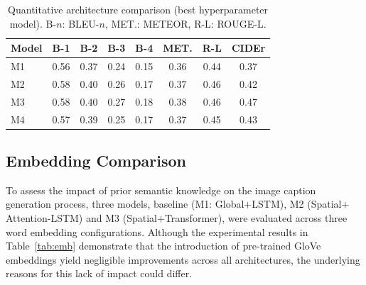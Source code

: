 \documentclass[10pt,twocolumn,letterpaper]{article}
\begin{document}
\begin{table}[t]
\begin{center}
\setlength{\tabcolsep}{4pt}
\begin{tabular}{lccccccc}
\toprule
Model & B-1 & B-2 & B-3 & B-4 & MET. & R-L & CIDEr \\
\midrule
M1 & 0.56 & 0.37 & 0.24 & 0.15 & 0.36 & 0.44 & 0.37 \\
M2 & 0.58 & 0.40 & 0.26 & 0.17 & 0.37 & 0.46 & 0.42 \\
M3 & 0.58 & 0.40 & 0.27 & 0.18 & 0.38 & 0.46 & 0.47 \\
M4 & 0.57 & 0.39 & 0.25 & 0.17 & 0.37 & 0.45 & 0.43 \\
\bottomrule
\end{tabular}
\caption{\footnotesize Quantitative architecture comparison (best
hyperparameter model). B-$n$: BLEU-$n$, MET.: METEOR, R-L: ROUGE-L.}
\label{tab:arch}
\end{center}
\end{table}

\subsection{Embedding Comparison}
To assess the impact of prior semantic knowledge on the image caption
generation process, three models, baseline (M1: Global$+$LSTM), M2
(Spatial$+$Attention-LSTM) and M3 (Spatial$+$Transformer), were
evaluated across three word embedding configurations. Although the
experimental results in Table~\ref{tab:emb} demonstrate that the
introduction of pre-trained GloVe embeddings yield negligible
improvements across all architectures, the underlying reasons for
this lack of impact could differ.
\end{document}
